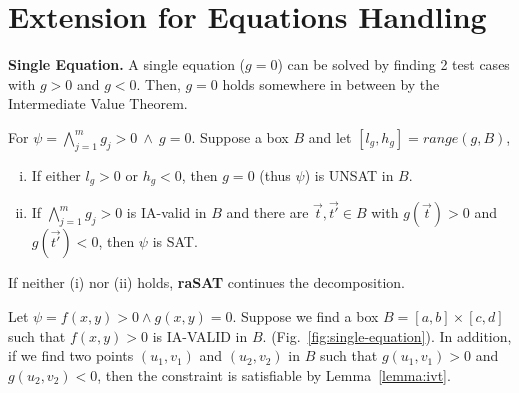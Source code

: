 \documentclass[runningheads,a4paper,oribibl]{llncs}
\newcommand{\suppress}[1]{} %
\begin{document}
\section{Extension for Equations Handling} \label{sec:eq}

\medskip \noindent 
\textbf{Single Equation.}
A single equation (${g=0}$) can be solved by finding 2 test cases with $g > 0$ and $g < 0$.
Then, $g=0$ holds somewhere in between by the Intermediate Value Theorem.

\begin{lemma} \label{lemma:ivt}
For $\psi =
\bigwedge \limits_{j=1}^m g_j > 0~\wedge~g = 0$.
Suppose a box
$B$
and
let ${[l_g, h_g] = range(g, B)}$, 
\begin{enumerate}[(i)]
\item If either $l_g > 0$ or $h_g < 0$, then $g = 0$ (thus $\psi$) is UNSAT in $B$. 
\item If $\bigwedge \limits_{j=1}^m g_j > 0$ is IA-valid in $B$ and there are $\vec{t},\vec{t'} \in B$
  with $g(\vec{t}) > 0$ and $g(\vec{t'}) < 0$, then $\psi$ is SAT.
\end{enumerate}
\end{lemma}

\suppress{
\begin{proof}
\begin{enumerate}[(i)]
\item If $l_g > 0$ or $h_g < 0$, then $g=0$ cannot be satisfied in box $I$.
  As a result, $F$ is UNSAT in $I$. 
\item If there are two instances $\vec{t},\vec{t'}$ in the box with
  $g(\vec{t}) > 0$ and $g(\vec{t'}) < 0$, it is clear from the Intermediate
  Value Theorem that there exist one point $\vec{t_0}$ between $\vec{t}$ and
  $\vec{t'}$ such that $g(\vec{t_0}) = 0$. In addition, because
  $\bigwedge \limits_{j}^m f_j > 0$ is IA-VALID in $I$, $\vec{t_0}$ also
  satisfies $\bigwedge \limits_{j}^m f_j > 0$.
  As a result, $F$ is satisfiable with $\vec{t_0}$ as the SAT instance.
\end{enumerate}
\end{proof}
}
If neither (i) nor (ii) holds, \textbf{raSAT} continues the decomposition.
\begin{example}
  Let $\psi = f(x, y) > 0 \wedge g(x, y) = 0$.
  Suppose we find a box 
  ${B = [a, b] \times [c, d]}$
  such that $f(x, y) > 0$ is IA-VALID in $B$.
  (Fig.~\ref{fig:single-equation}).
  In addition, 
  if we find two points $(u_1, v_1)$ and $(u_2, v_2)$ in $B$ such that
  $g(u_1, v_1) > 0$ and $g(u_2, v_2) < 0$,
  then the constraint is satisfiable by Lemma~\ref{lemma:ivt}. 
\end{example}
\end{document}
